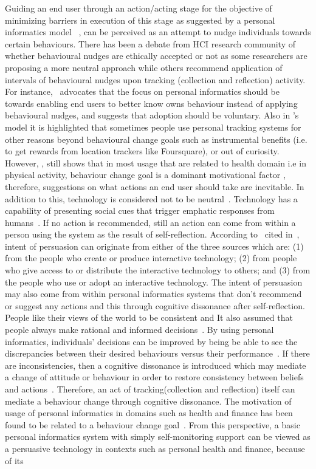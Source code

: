 Guiding an end user through an action/acting stage for the objective of minimizing barriers in execution of this stage as suggested by a personal informatics model ~\citep{li2010stage}, can be perceived as an attempt to nudge individuals towards certain behaviours. There has been a debate from HCI research community of whether behavioural nudges are ethically accepted or not as some researchers are proposing a more neutral approach while others recommend application of intervals of behavioural nudges upon tracking (collection and reflection) activity.  For instance,~\cite{munson2012mindfulness} advocates that the focus on personal informatics  should be towards enabling end users to better know owns behaviour instead of applying behavioural nudges, and suggests that adoption should be voluntary. Also in \cite{epstein2015lived}'s model it is highlighted that sometimes people use personal tracking systems for other reasons beyond behavioural change goals such as instrumental benefits (i.e. to get rewards from location trackers like Foursquare), or out of curiosity.  However, \cite{epstein2015lived}, still  shows that in most usage that are related to health domain i.e in physical activity, behaviour change goal is a dominant motivational factor \citep{epstein2015lived}, therefore, suggestions on what actions an end user should take are inevitable. In addition to this, technology is considered not to be neutral~\citep{Oinas-kukkonen:psd}. Technology has a capability of presenting social cues that trigger emphatic responses from humans~\citep{foggpersuasivebook}. If no action is recommended, still an action can come from within a person using the system as the result of self-reflection. According to~\cite{fogg1998persuasive} cited in~\cite{Oinas-kukkonen:psd}, intent of persuasion can originate from either of the three sources which are: (1) from the people who create or produce interactive technology; (2) from people who give access to or distribute the interactive technology to others; and (3) from the people who use or adopt an interactive technology. The intent of persuasion may also come from within personal informatics systems that don't recommend or suggest any actions and this through cognitive dissonance after self-reflection. People like their views of the world to be consistent and It also assumed that people always make rational and informed decisions~\citep{Oinas-kukkonen:psd}. By using personal informatics, individuals' decisions can be improved by being be able to see the discrepancies between their desired behaviours versus their performance~\citep{comber2013designing}. If there are inconsistencies, then a cognitive dissonance is introduced which may mediate a change of attitude or behaviour in order to restore consistency between beliefs and actions~\citep{Oinas-kukkonen:psd}. Therefore, an act of tracking(collection and reflection) itself can mediate a behaviour change through cognitive dissonance. The motivation of usage of personal informatics in domains such as health and finance has been found to be related to a behaviour change goal~\citep{epstein2015lived}. From this perspective, a basic personal informatics system with simply self-monitoring support can be viewed as a persuasive technology in contexts such as personal health and finance, because of its 